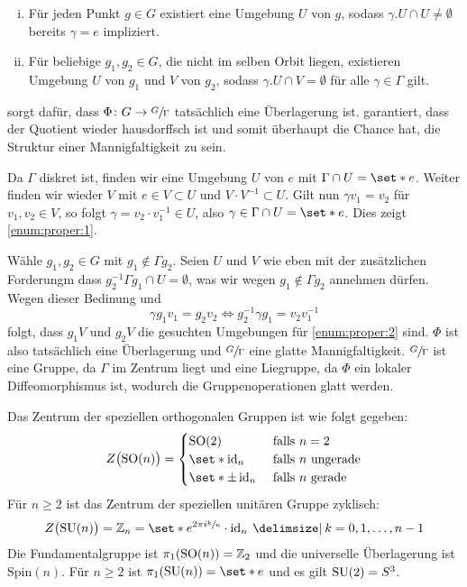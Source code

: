 \begin{beweis}
\begin{enumerate}[1)]
\begin{enumerate}[(i)]
			\item \label{enum:proper:1} Für jeden Punkt $g \in G$ existiert eine Umgebung $U$ von $g$, sodass $\gamma.U \cap U \neq \emptyset$ bereits $\gamma=e$ impliziert.
			\item \label{enum:proper:2} Für beliebige $g_1,g_2 \in G$, die nicht im selben Orbit liegen, existieren Umgebung $U$ von $g_1$ und $V$ von $g_2$, sodass $\gamma.U \cap V = \emptyset$ für alle $\gamma \in \Gamma$ gilt.
		\end{enumerate}
		 sorgt dafür, dass $\Phi \colon G \to \sfrac{G}{\Gamma}$ tatsächlich eine Überlagerung ist. 
		 garantiert, dass der Quotient wieder hausdorffsch ist und somit überhaupt die Chance hat, die Struktur einer Mannigfaltigkeit zu sein.
		
		Da $\Gamma$ diskret ist, finden wir eine Umgebung $U$ von $e$ mit $\Gamma \cap U = \set*{e}$.
		Weiter finden wir wieder $V$ mit $e \in V \subset U$ und $V \cdot V^{-1} \subset U$.
		Gilt nun $\gamma v_1 = v_2$ für $v_1, v_2 \in V$, so folgt $\gamma = v_2 \cdot v_1^{-1} \in U$, also $\gamma \in \Gamma \cap U = \set*{e}$.
		Dies zeigt \cref{enum:proper:1}.
		
		Wähle $g_1, g_2 \in G$ mit $g_1 \notin \Gamma g_2$.
		Seien $U$ und $V$ wie eben mit der zusätzlichen Forderungm dass $g_2^{-1} \Gamma g_1 \cap U = \emptyset$, was wir wegen $g_1 \notin \Gamma g_2$ annehmen dürfen.
		Wegen dieser Bedinung und
		\[
			\gamma g_1 v_1 = g_2 v_2 \iff g_2^{-1} \gamma g_1 = v_2 v_1^{-1}
		\]
		folgt, dass $g_1 V$ und $g_2 V$ die gesuchten Umgebungen für \cref{enum:proper:2} sind.
		$\Phi$ ist also tatsächlich eine Überlagerung und $\sfrac{G}{\Gamma}$ eine glatte Mannigfaltigkeit. 
		$\sfrac{G}{\Gamma}$ ist eine Gruppe, da $\Gamma$ im Zentrum liegt und eine Liegruppe, da $\Phi$ ein lokaler Diffeomorphismus ist, wodurch die Gruppenoperationen glatt werden.\qedhere
    \end{enumerate}
\end{beweis}

\begin{beispiel*}[{name=[Zentren der speziellen orthogonalen und unitären Gruppen]}]
	Das Zentrum der speziellen orthogonalen Gruppen ist wie folgt gegeben:
	\[
	    Z \enbrace[\big]{\SO(n)} = \begin{cases}
			\SO(2) &\text{ falls } n=2 \\ 
	        \set*{\id_n} &\text{ falls } n \text{ ungerade} \\
	        \set*{\pm \id_n} &\text{ falls $n$ gerade}
	    \end{cases}
	\]
	Für $n \ge 2$ ist das Zentrum der speziellen unitären Gruppe zyklisch:
	\[
	    Z \enbrace[\big]{\SU(n)} = \mathbb{Z}_n = \set*{e^{2 \pi i \sfrac{k}{n}} \cdot \id_n \given k=0,1,\ldots ,n-1 }
	\]
	Die Fundamentalgruppe ist $\pi_1(\operatorname{SO}(n))= \mathbb{Z}_2$ und die universelle Überlagerung ist $\mathrm{Spin}(n)$.
	Für $n\ge 2$ ist $\pi_1 \enbrace*{\SU(n)} = \set*{e}$ und es gilt $\operatorname{SU}(2) = S^3$.
\end{beispiel*}

